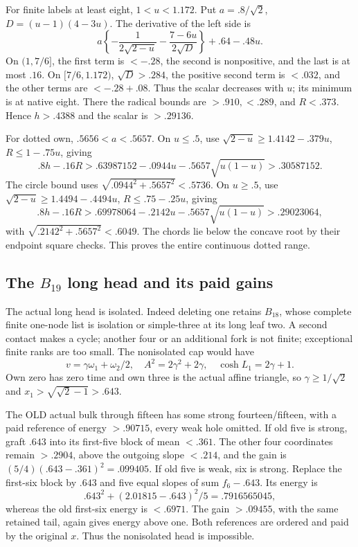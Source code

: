 For finite labels at least eight,
\(1<u<1.172\).
Put \(a=.8/\sqrt2\),
\(D=(u-1)(4-3u)\).
The derivative of the left side is
\[
 a\left\{-\frac1{2\sqrt{2-u}}-\frac{7-6u}{2\sqrt D}\right\}
                         +.64-.48u .
\]
On \((1,7/6]\), the first term is
\(<-.28\), the second is nonpositive,
and the last is at most \(.16\).
On \([7/6,1.172)\), \(\sqrt D>.284\),
the positive second term is
\(<.032\), and the other terms
are \(<-.28+.08\).
Thus the scalar decreases with
\(u\); its minimum is at native
eight.
There the radical bounds are
\(>.910,<.289\), and \(R<.373\).
Hence \(h>.4388\) and the scalar
is \(>.29136\).

For dotted own,
\(.5656<a<.5657\).
On \(u\le.5\), use
\(\sqrt{2-u}\ge1.4142-.379u\),
\(R\le1-.75u\), giving
\[
 .8h-.16R>.63987152-.0944u-.5657\sqrt{u(1-u)}
                                      >.30587152 .
\]
The circle bound uses
\(\sqrt{.0944^2+.5657^2}<.5736\).
On \(u\ge.5\), use
\(\sqrt{2-u}\ge1.4494-.4494u\),
\(R\le.75-.25u\), giving
\[
 .8h-.16R>.69978064-.2142u-.5657\sqrt{u(1-u)}
                                      >.29023064 ,
\]
with \(\sqrt{.2142^2+.5657^2}<.6049\).
The chords lie below the concave
root by their endpoint square
checks.
This proves the entire continuous
dotted range.

\subsection{The \(B_{19}\) long head and its paid gains}
\label{app:exact19:Bhead}

The actual long head is isolated.
Indeed deleting one retains
\(B_{18}\), whose complete finite
one-node list is isolation or
simple-three at its long leaf two.
A second contact makes a cycle;
another four or an additional fork
is not finite; exceptional finite
ranks are too small.
The nonisolated cap would have
\[
 v=\gamma\omega_1+\omega_2/2,\quad
 A^2=2\gamma^2+2\gamma,\quad\cosh L_1=2\gamma+1 .
\]
Own zero has zero time and own
three is the actual affine
triangle, so \(\gamma\ge1/\sqrt2\)
and \(x_1>\sqrt{\sqrt2-1}>.643\).

The OLD actual bulk through fifteen
has some strong fourteen/fifteen,
with a paid reference of energy
\(>.90715\), every weak hole omitted.
If old five is strong, graft
\(.643\) into its first-five block
of mean \(<.361\).
The other four coordinates remain
\(>.2904\), above the outgoing
slope \(<.214\), and the gain is
\((5/4)(.643-.361)^2=.099405\).
If old five is weak, six is strong.
Replace the first-six block by
\(.643\) and five equal slopes
of sum \(f_6-.643\).
Its energy is
\[
 .643^2+(2.01815-.643)^2/5=.7916565045 ,
\]
whereas the old first-six energy
is \(<.6971\).
The gain \(>.09455\), with the
same retained tail, again gives
energy above one.
Both references are ordered and
paid by the original \(x\).
Thus the nonisolated head is
impossible.

